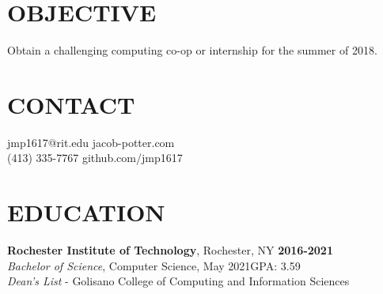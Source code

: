 \documentclass[line,margin]{res}
\begin{document}

\begin{resume}

\section{OBJECTIVE}
Obtain a challenging computing co-op or internship for the summer of 2018.

\section{CONTACT}
{jmp1617@rit.edu}\hfill 
{jacob-potter.com}\\
(413) 335-7767\hfill 
{github.com/jmp1617}

\section{EDUCATION}
\textbf{Rochester Institute of Technology}, Rochester, NY\hfill
    \textbf{2016-2021}\\
{\sl Bachelor of Science}, Computer Science, May 2021\hfill GPA: 3.59
\\
{\sl Dean's List} - Golisano College of Computing and Information Sciences


\end{resume}
\end{document}
